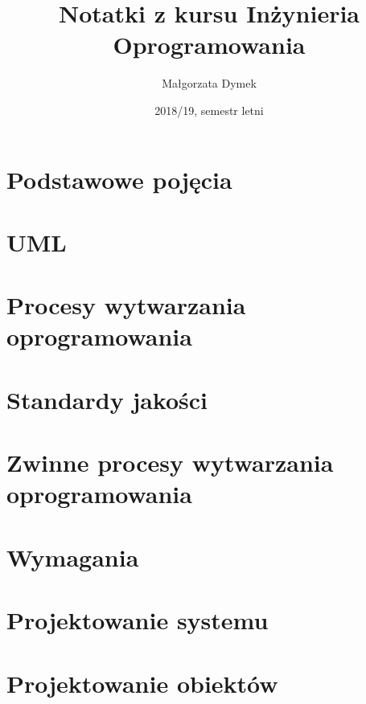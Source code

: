 \documentclass[a4paper]{article}
\title{Notatki z kursu Inżynieria Oprogramowania}
\author{Małgorzata Dymek}
\date{2018/19, semestr letni}
\begin{document}
    \maketitle

    \section{Podstawowe pojęcia}
    

    \section {UML}
    


    \section{Procesy wytwarzania oprogramowania}
    


    \section{Standardy jakości}
    

    \section{Zwinne procesy wytwarzania oprogramowania}
    


    \section{Wymagania}
    

    \section{Projektowanie systemu}
    

    \section{Projektowanie obiektów}
    
\end{document}
